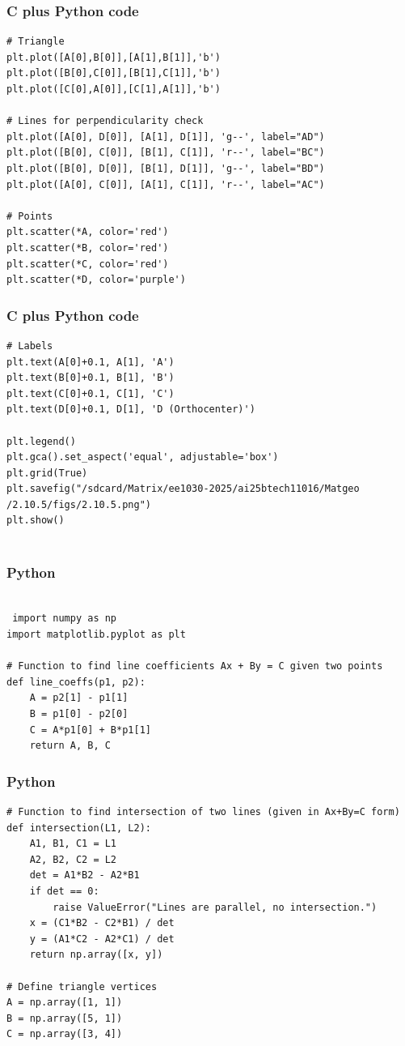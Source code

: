 \documentclass{beamer}
\begin{document}
\begin{frame}[fragile]
    \frametitle{C plus Python code}
    \begin{lstlisting}
# Triangle
plt.plot([A[0],B[0]],[A[1],B[1]],'b')
plt.plot([B[0],C[0]],[B[1],C[1]],'b')
plt.plot([C[0],A[0]],[C[1],A[1]],'b')

# Lines for perpendicularity check
plt.plot([A[0], D[0]], [A[1], D[1]], 'g--', label="AD")
plt.plot([B[0], C[0]], [B[1], C[1]], 'r--', label="BC")
plt.plot([B[0], D[0]], [B[1], D[1]], 'g--', label="BD")
plt.plot([A[0], C[0]], [A[1], C[1]], 'r--', label="AC")

# Points
plt.scatter(*A, color='red')
plt.scatter(*B, color='red')
plt.scatter(*C, color='red')
plt.scatter(*D, color='purple')
\end{lstlisting}
 
\end{frame}
\begin{frame}[fragile]
    \frametitle{C plus Python code}
    \begin{lstlisting}
# Labels
plt.text(A[0]+0.1, A[1], 'A')
plt.text(B[0]+0.1, B[1], 'B')
plt.text(C[0]+0.1, C[1], 'C')
plt.text(D[0]+0.1, D[1], 'D (Orthocenter)')

plt.legend()
plt.gca().set_aspect('equal', adjustable='box')
plt.grid(True)
plt.savefig("/sdcard/Matrix/ee1030-2025/ai25btech11016/Matgeo
/2.10.5/figs/2.10.5.png")
plt.show()


\end{lstlisting}
 
\end{frame}
\begin{frame}[fragile]
    \frametitle{Python}
    \begin{lstlisting}

 import numpy as np
import matplotlib.pyplot as plt

# Function to find line coefficients Ax + By = C given two points
def line_coeffs(p1, p2):
    A = p2[1] - p1[1]
    B = p1[0] - p2[0]
    C = A*p1[0] + B*p1[1]
    return A, B, C
\end{lstlisting}
 
\end{frame}
\begin{frame}[fragile]
    \frametitle{Python}
    \begin{lstlisting}
# Function to find intersection of two lines (given in Ax+By=C form)
def intersection(L1, L2):
    A1, B1, C1 = L1
    A2, B2, C2 = L2
    det = A1*B2 - A2*B1
    if det == 0:
        raise ValueError("Lines are parallel, no intersection.")
    x = (C1*B2 - C2*B1) / det
    y = (A1*C2 - A2*C1) / det
    return np.array([x, y])

# Define triangle vertices
A = np.array([1, 1])
B = np.array([5, 1])
C = np.array([3, 4])
\end{lstlisting}
 
\end{frame}
\end{document}
